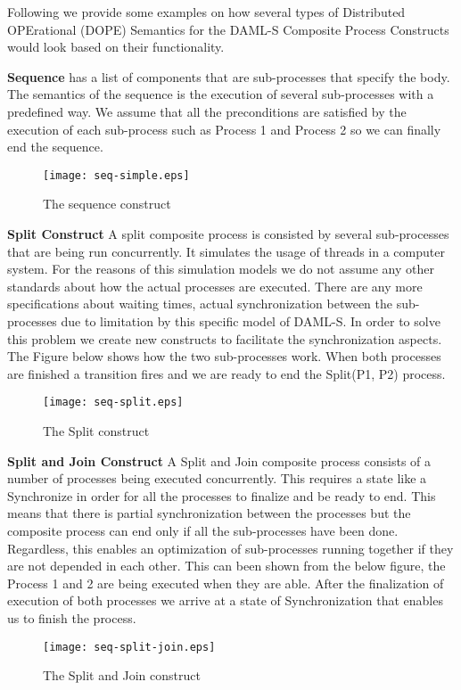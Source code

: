 Following we provide some examples on how several types of Distributed OPErational (DOPE) Semantics for the DAML-S Composite Process Constructs would look based on their functionality.

\vspace{1em}
\textbf{Sequence} has a list of components that are sub-processes that specify the body. The semantics of the sequence is the execution of several sub-processes with a predefined way. We assume that all the preconditions are satisfied by the execution of each sub-process such as Process 1 and Process 2 so we can finally end the sequence.
\begin{figure}[h]
    \centering
    \texttt{[image: seq-simple.eps]}
    \caption{The sequence construct}
    \label{fig:Conditional effects and outputs}
\end{figure}
\vspace{1em}

\textbf{Split Construct} A split composite process is consisted by several sub-processes that are being run concurrently. It simulates the usage of threads in a computer system. For the reasons of this simulation models we do not assume any other standards about how the actual processes are executed. There are any more specifications about waiting times, actual synchronization between the sub-processes due to limitation by this specific model of DAML-S. In order to solve this problem we create new constructs to facilitate the synchronization aspects. The Figure below shows how the two sub-processes work. When both processes are finished a transition fires and we are ready to end the Split(P1, P2) process.
\begin{figure}[h]
    \centering
    \texttt{[image: seq-split.eps]}
    \caption{The Split construct}
    \label{fig:Conditional effects and outputs}
\end{figure}
\vspace{1em}

\textbf{Split and Join Construct} A Split and Join composite process consists of a number of processes being executed concurrently. This requires a state like a Synchronize in order for all the processes to finalize and be ready to end. This means that there is partial synchronization between the processes but the composite process can end only if all the sub-processes have been done. Regardless, this enables an optimization of sub-processes running together if they are not depended in each other. This can been shown from the below figure, the Process 1 and 2 are being executed when they are able. After the finalization of execution of both processes we arrive at a state of Synchronization that enables us to finish the process.
\begin{figure}[H]
    \centering
    \texttt{[image: seq-split-join.eps]}
    \caption{The Split and Join construct}
    \label{fig:Conditional effects and outputs}
\end{figure}
\vspace{1em}


